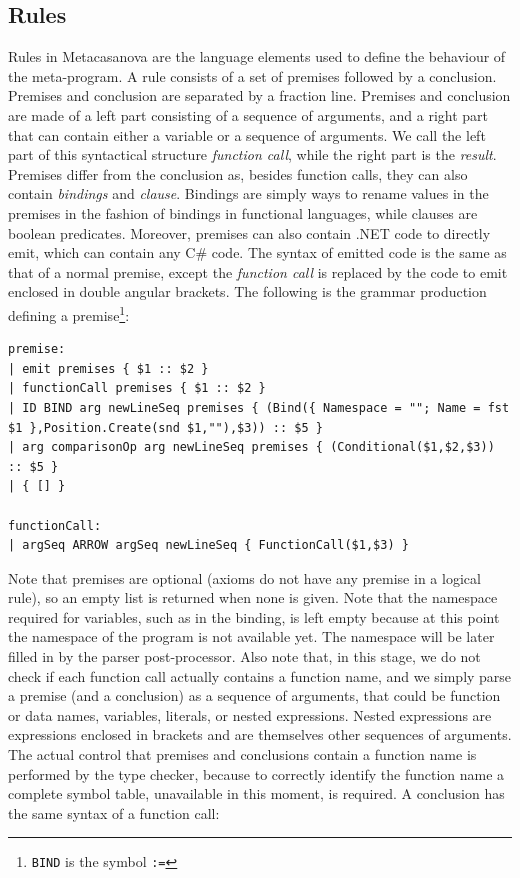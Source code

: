 \subsection{Rules}
\label{sec:ch_metacasanova_parser_rules}
Rules in Metacasanova are the language elements used to define the behaviour of the meta-program. A rule consists of a set of premises followed by a conclusion. Premises and conclusion are separated by a fraction line. Premises and conclusion are made of a left part consisting of a sequence of arguments, and a right part that can contain either a variable or a sequence of arguments. We call the left part of this syntactical structure \textit{function call}, while the right part is the \textit{result}. Premises differ from the conclusion as, besides function calls, they can also contain \textit{bindings} and \textit{clause}. Bindings are simply ways to rename values in the premises in the fashion of bindings in functional languages, while clauses are boolean predicates. Moreover, premises can also contain .NET code to directly emit, which can contain any C\# code. The syntax of emitted code is the same as that of a normal premise, except the \textit{function call} is replaced by the code to emit enclosed in double angular brackets. The following is the grammar production defining a premise\footnote{ \texttt{BIND} is the symbol \texttt{:=}}:

\begin{lstlisting}
premise:
| emit premises { $1 :: $2 }
| functionCall premises { $1 :: $2 }
| ID BIND arg newLineSeq premises { (Bind({ Namespace = ""; Name = fst $1 },Position.Create(snd $1,""),$3)) :: $5 }
| arg comparisonOp arg newLineSeq premises { (Conditional($1,$2,$3)) :: $5 }
| { [] }

functionCall:
| argSeq ARROW argSeq newLineSeq { FunctionCall($1,$3) }
\end{lstlisting}

Note that premises are optional (axioms do not have any premise in a logical rule), so an empty list is returned when none is given. Note that the namespace required for variables, such as in the binding, is left empty because at this point the namespace of the program is not available yet. The namespace will be later filled in by the parser post-processor. Also note that, in this stage, we do not check if each function call actually contains a function name, and we simply parse a premise (and a conclusion) as a sequence of arguments, that could be function or data names, variables, literals, or nested expressions. Nested expressions are expressions enclosed in brackets and are themselves other sequences of arguments. The actual control that premises and conclusions contain a function name is performed by the type checker, because to correctly identify the function name a complete symbol table, unavailable in this moment, is required. A conclusion has the same syntax of a function call:

